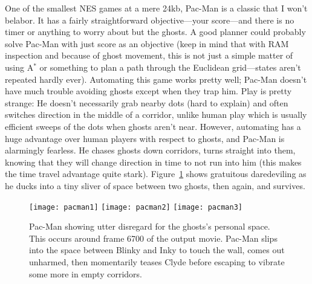 \documentclass[twocolumn]{article}
\begin{document}
One of the smallest NES games at a mere 24kb, Pac-Man is a classic
that I won't belabor. It has a fairly straightforward objective---your
score---and there is no timer or anything to worry about but the
ghosts. A good planner could probably solve Pac-Man with just score as
an objective (keep in mind that with RAM inspection and because of
ghost movement, this is not just a simple matter of using A$^{*}$ or
something to plan a path through the Euclidean grid---states aren't
repeated hardly ever). Automating this game works pretty well; Pac-Man
doesn't have much trouble avoiding ghosts except when they trap him.
Play is pretty strange: He doesn't necessarily grab nearby dots (hard
to explain) and often switches direction in the middle of a corridor,
unlike human play which is usually efficient sweeps of the dots when
ghosts aren't near. However, automating has a huge advantage over human
players with respect to ghosts, and Pac-Man is alarmingly fearless. He
chases ghosts down corridors, turns straight into them, knowing that
they will change direction in time to not run into him (this makes
the time travel advantage quite stark). Figure~\ref{fig:pacman} shows
gratuitous daredeviling as he ducks into a tiny sliver of space between
two ghosts, then again, and survives.

\begin{figure}[ht]
\begin{center}
\texttt{[image: pacman1]}
\texttt{[image: pacman2]}
\texttt{[image: pacman3]}
\end{center}\vspace{-0.1in}
\caption{Pac-Man showing utter disregard for the ghosts's personal
  space. This occurs around frame 6700 of the output movie. Pac-Man
  slips into the space between Blinky and Inky to touch the wall,
  comes out unharmed, then momentarily teases Clyde before escaping
  to vibrate some more in empty corridors.}
\label{fig:pacman}
\end{figure}
\end{document}
